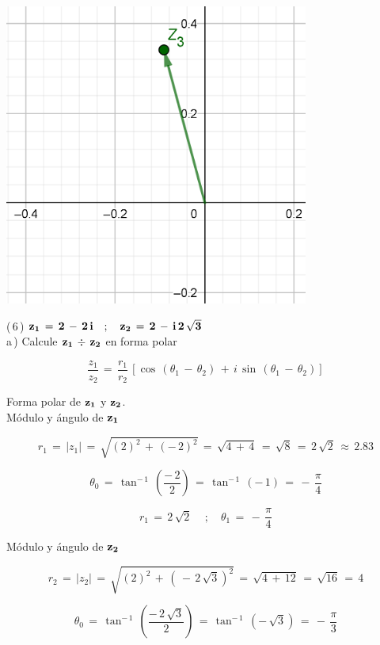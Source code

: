 \documentclass[a4paper,11pt,openany]{book}
\begin{document}
\begin{center}
    \includegraphics[width=10cm]{Gra-Ej-5-2.png}
\end{center}

\textcolor{ao(english)}{(\,6\,)} $\bf{z_{1}\,=\,2\,-\,2\,i \quad;\quad z_{2}\,=\,2\,-\,i\,2\,\sqrt{3}}$\\

\textcolor{ao(english)}{a\,)} Calcule $\bf{z_{1}\,\div\,z_{2}}$ en forma polar

$$\dfrac{z_{1}}{z_{2}}\,=\,\dfrac{r_{1}}{r_{2}}\,\left[\cos\,(\theta_{1}\,-\,\theta_{2})\,+\,i\,\sin\,(\theta_{1}\,-\,\theta_{2})\right]$$

\textcolor{ao(english)}{} Forma polar de $\bf{z_{1}}$ y $\bf{z_{2}}$.\\

\textcolor{ao(english)}{} Módulo y ángulo de $\bf{z_{1}}$ 

$$r_{1}\,=\,|z_{1}|\,=\,\sqrt{(2)^{2}\,+\,(-\,2)^{2}}\,=\,\sqrt{4\,+\,4}\,=\,\sqrt{8}\,=\,2\,\sqrt{2}\,\approx\,2.83$$

$$\theta_{0}\,=\,\tan^{-\,1}\,\left(\dfrac{-\,2}{2}\right)\,=\,\tan^{-\,1}\,(-\,1)\,=\,-\,\dfrac{\pi}{4}$$

$$\boxed{r_{1}\,=\,2\,\sqrt{2}\, \quad;\quad \theta_{1}\,=\,-\,\dfrac{\pi}{4}}$$

\textcolor{ao(english)}{} Módulo y ángulo de $\bf{z_{2}}$ 

$$r_{2}\,=\,|z_{2}|\,=\,\sqrt{(2)^{2}\,+\,(\,-\,2\,\sqrt{3})^{2}}\,=\,\sqrt{4\,+\,12}\,=\,\sqrt{16}\,=\,4$$

$$\theta_{0}\,=\,\tan^{-\,1}\,\left(\dfrac{-\,2\,\sqrt{3}}{2}\right)\,=\,\tan^{-\,1}\,(-\,\sqrt{3})\,=\,-\,\dfrac{\pi}{3}$$
\end{document}
